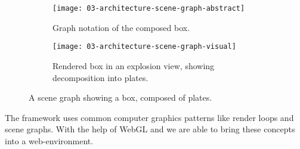 \documentclass[../03-Architecture.tex]{subfiles}
\begin{document}
\begin{figure}[H]
  \centering
  \begin{subfigure}[b]{0.49\textwidth}
    \centering
    \texttt{[image: 03-architecture-scene-graph-abstract]}
    \caption{Graph notation of the composed box.}
    \label{fig:scene-graph:abstract}
  \end{subfigure}
  \begin{subfigure}[b]{0.49\textwidth}
    \centering
    \texttt{[image: 03-architecture-scene-graph-visual]}
    \caption{Rendered box in an explosion view, showing decomposition into plates.}
    \label{fig:scene-graph:visual}
  \end{subfigure}
  \caption{A scene graph showing a box, composed of plates.}
  \label{fig:scene-graph}
\end{figure}


The framework {\convertify} uses common computer graphics
patterns like render loops and scene graphs. With the help
of WebGL and {\threejs} we are able to bring these concepts
into a web-environment.
\end{document}
